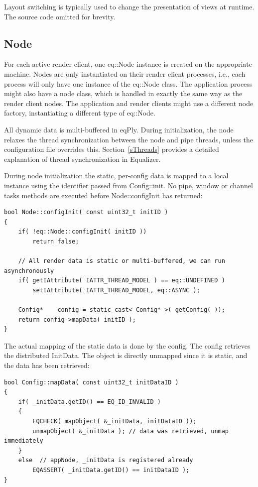 \documentclass[10pt,a4]{scrartcl}
\newcommand{\sref}[1]{Section~\ref{#1}}
\begin{document}
Layout switching is typically used to change the presentation of views
at runtime. The source code omitted for brevity.


\subsection{Node}

For each active render client, one \textsf{eq::Node} instance is
created on the appropriate machine. Nodes are only instantiated on their
render client processes, i.e., each process will only have one
instance of the \textsf{eq::Node} class. The application process might
also have a node class, which is handled in exactly the same way as the
render client nodes. The application and render clients might use a
different node factory, instantiating a different type of \textsf{eq::Node}.

All dynamic data is multi-buffered in \textsf{eqPly}. During
initialization, the node relaxes the thread synchronization between the
node and pipe threads, unless the configuration file overrides
this. \sref{sThreads} provides a detailed explanation of thread
synchronization in Equalizer.

During node initialization the static, per-config data is mapped to a
local instance using the identifier passed from
\textsf{Config::init}. No pipe, window or channel tasks methods are
executed before \textsf{Node::configInit} has returned:

{\footnotesize\begin{lstlisting}
bool Node::configInit( const uint32_t initID )
{
    if( !eq::Node::configInit( initID ))
        return false;

    // All render data is static or multi-buffered, we can run asynchronously
    if( getIAttribute( IATTR_THREAD_MODEL ) == eq::UNDEFINED )
        setIAttribute( IATTR_THREAD_MODEL, eq::ASYNC );

    Config*    config = static_cast< Config* >( getConfig( ));
    return config->mapData( initID );
}
\end{lstlisting}}

The actual mapping of the static data is done by the config. The config
retrieves the distributed \textsf{InitData}. The object is directly
unmapped since it is static, and the data has been retrieved:

{\footnotesize\begin{lstlisting}
bool Config::mapData( const uint32_t initDataID )
{
    if( _initData.getID() == EQ_ID_INVALID )
    {
        EQCHECK( mapObject( &_initData, initDataID ));
        unmapObject( &_initData ); // data was retrieved, unmap immediately
    }
    else  // appNode, _initData is registered already
        EQASSERT( _initData.getID() == initDataID );
}
\end{lstlisting}}
\end{document}
